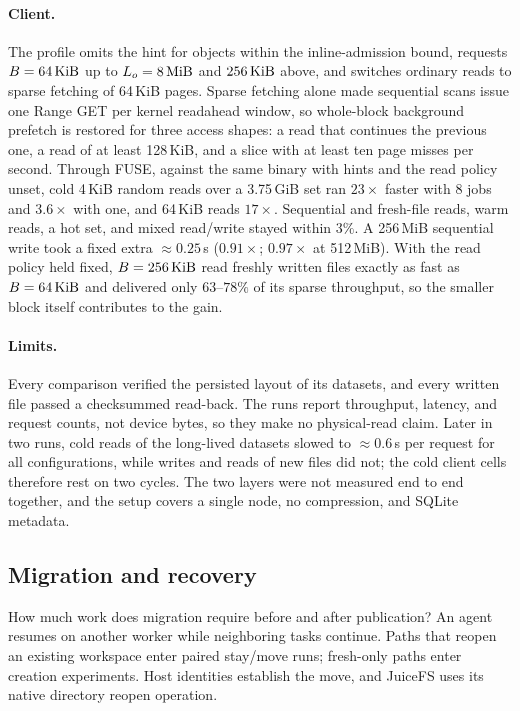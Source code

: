 \paragraph{Client.} The \sys {} profile omits the hint
for objects within the inline-admission bound, requests $B=64\,\mathrm{KiB}$ up to
$L_o=8\,\mathrm{MiB}$ and $256\,\mathrm{KiB}$ above, and switches ordinary reads to sparse
fetching of 64\,KiB pages. Sparse fetching alone made sequential scans
issue one Range GET per kernel readahead window, so whole-block background
prefetch is restored for three access shapes: a read that continues the
previous one, a read of at least 128\,KiB, and a slice with at least ten
page misses per second. Through FUSE, against the same binary with hints
and the read policy unset, cold 4\,KiB random reads over a 3.75\,GiB set
ran $23\times$ faster with 8 jobs and $3.6\times$ with one, and 64\,KiB
reads $17\times$. Sequential and fresh-file reads, warm reads, a hot set,
and mixed read/write stayed within $3\%$. A 256\,MiB sequential write took
a fixed extra ${\approx}0.25$\,s ($0.91\times$; $0.97\times$ at 512\,MiB).
With the read policy held fixed, $B=256\,\mathrm{KiB}$ read freshly written files
exactly as fast as $B=64\,\mathrm{KiB}$ and delivered only $63$--$78\%$ of its sparse
throughput, so the smaller block itself contributes to the gain.

\paragraph{Limits.} Every comparison verified the persisted layout of its
datasets, and every written file passed a checksummed read-back. The runs
report throughput, latency, and request counts, not device bytes, so they
make no physical-read claim. Later in two runs, cold reads of the
long-lived datasets slowed to ${\approx}0.6$\,s per request for all
configurations, while writes and reads of new files did not; the cold
client cells therefore rest on two cycles. The two layers were not
measured end to end together, and the setup covers a single node, no
compression, and SQLite metadata.



\subsection{Migration and recovery}

 How much work does migration require before and after
publication?
An agent resumes on another worker while neighboring tasks continue.
Paths that reopen an existing workspace enter paired stay/move runs;
fresh-only paths enter creation experiments. Host identities establish
the move, and JuiceFS uses its native directory reopen operation.

